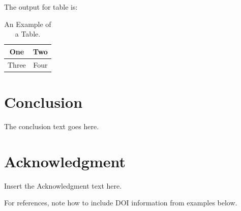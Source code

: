 \documentclass[preprint,pteplogo]{ptephy_v2}%
\begin{document}

\vskip2pc

\noindent The output for table is:

\begin{table}[!h]
\caption{An Example of a Table.}%
\label{table_example_a}
\centering
\begin{tabular}{|c||c|}%
\hline
One & Two\\ %
\hline
Three & Four\\%
\hline
\end{tabular}
\end{table}%

\section{Conclusion}
The conclusion text goes here.

\section*{Acknowledgment}

Insert the Acknowledgment text here.


%
%
%

\vspace{0.2cm}
\noindent
For references,  note how to include DOI information from examples below. 


\let\doi\relax

\end{document}
